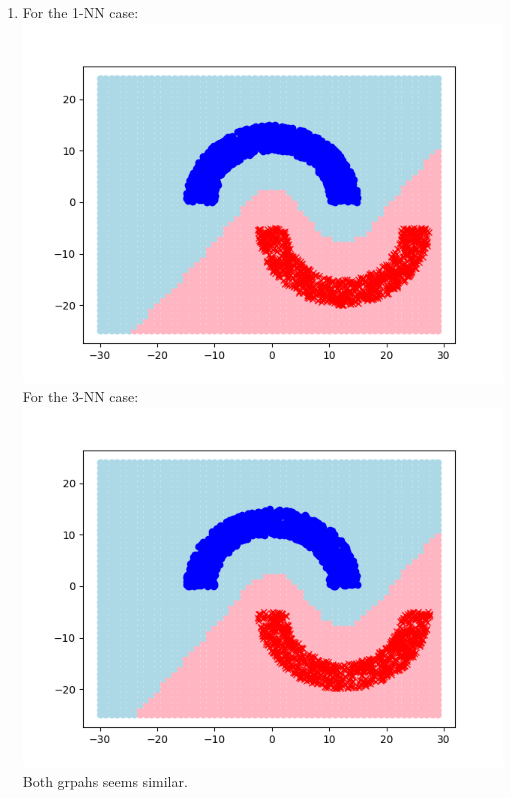 \documentclass{article}
\begin{document}
\begin{enumerate}
        \item For the 1-NN case:\\ \includegraphics[scale=0.5]{images/6_3_1NN.png}\\[0.25in]
        For the 3-NN case:\\ \includegraphics[scale=0.5]{images/6_3_3NN.png}\\[0.25in]
        Both grpahs seems similar.


\end{enumerate}
\end{document}
